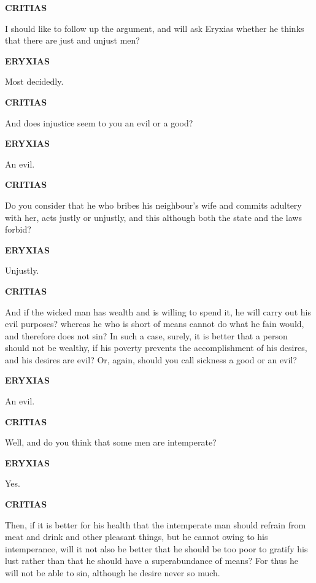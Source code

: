 \documentclass[11pt,letter]{article}
\begin{document}
\par \textbf{CRITIAS}
\par   I should like to follow up the argument, and will ask Eryxias whether he thinks that there are just and unjust men?

\par \textbf{ERYXIAS}
\par   Most decidedly.

\par \textbf{CRITIAS}
\par   And does injustice seem to you an evil or a good?

\par \textbf{ERYXIAS}
\par   An evil.

\par \textbf{CRITIAS}
\par   Do you consider that he who bribes his neighbour's wife and commits adultery with her, acts justly or unjustly, and this although both the state and the laws forbid?

\par \textbf{ERYXIAS}
\par   Unjustly.

\par \textbf{CRITIAS}
\par   And if the wicked man has wealth and is willing to spend it, he will carry out his evil purposes? whereas he who is short of means cannot do what he fain would, and therefore does not sin? In such a case, surely, it is better that a person should not be wealthy, if his poverty prevents the accomplishment of his desires, and his desires are evil? Or, again, should you call sickness a good or an evil?

\par \textbf{ERYXIAS}
\par   An evil.

\par \textbf{CRITIAS}
\par   Well, and do you think that some men are intemperate?

\par \textbf{ERYXIAS}
\par   Yes.

\par \textbf{CRITIAS}
\par   Then, if it is better for his health that the intemperate man should refrain from meat and drink and other pleasant things, but he cannot owing to his intemperance, will it not also be better that he should be too poor to gratify his lust rather than that he should have a superabundance of means? For thus he will not be able to sin, although he desire never so much.
\end{document}
